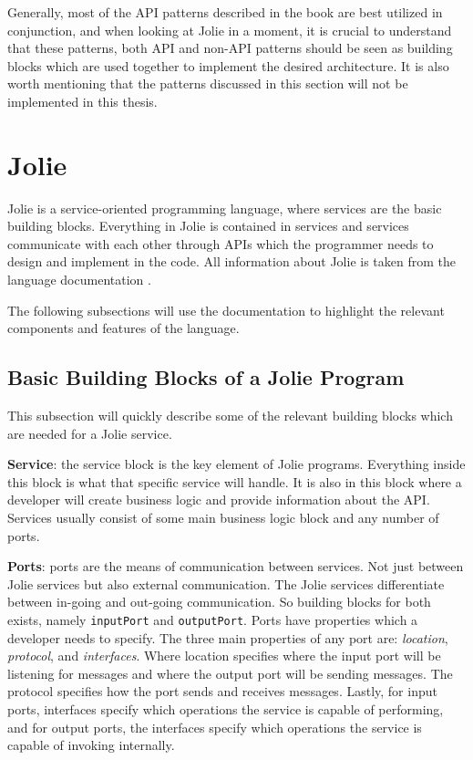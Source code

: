 Generally, most of the API patterns described in the book are best utilized in conjunction,
and when looking at Jolie in a moment, it is crucial to understand that these patterns, both API and non-API patterns
should be seen as building blocks which are used together to implement the desired architecture.
It is also worth mentioning that the patterns discussed in this section will not be implemented in this thesis.

\section{Jolie}
Jolie is a service-oriented programming language, where services are the basic building blocks.
Everything in Jolie is contained in services and services communicate with each other through APIs which the programmer needs to design and implement in the code. All information about Jolie 
is taken from the language documentation \cite{jolie}.

The following subsections will use the documentation to highlight the relevant components and features of the language.

\subsection{Basic Building Blocks of a Jolie Program}
This subsection will quickly describe some of the relevant building blocks which are needed for a Jolie service.

\textbf{Service}: the service block is the key element of Jolie programs. Everything inside this block is what that specific service will handle. It is also 
in this block where a developer will create business logic and provide information about the API. Services usually consist of some main business logic block and any number of ports.

\textbf{Ports}: ports are the means of communication between services. Not just between Jolie services but also external communication.
The Jolie services differentiate between in-going and out-going communication. So building blocks for both exists, namely \texttt{inputPort} and \texttt{outputPort}.
Ports have properties which a developer needs to specify. The three main properties of any port are: \emph{location}, \emph{protocol}, and \emph{interfaces}.
Where location specifies where the input port will be listening for messages and where the output port will be sending messages.
The protocol specifies how the port sends and receives messages. Lastly, for input ports, interfaces specify which
operations the service is capable of performing, and for output ports, the interfaces specify which
operations the service is capable of invoking internally. 

